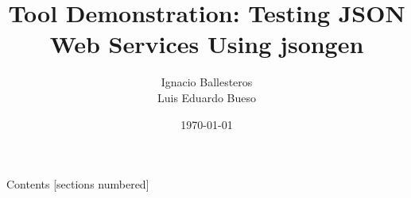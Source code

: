 \documentclass[10pt]{beamer}
\title{Tool Demonstration: Testing JSON Web Services Using jsongen}
\date{\today}
\author{
  Ignacio Ballesteros\\
  Luis Eduardo Bueso
}
\institute{UPM}
\begin{document}
\maketitle

\begin{frame}{Contents}
  [sections numbered]
  \tableofcontents[hideallsubsections]
\end{frame}








\end{document}
